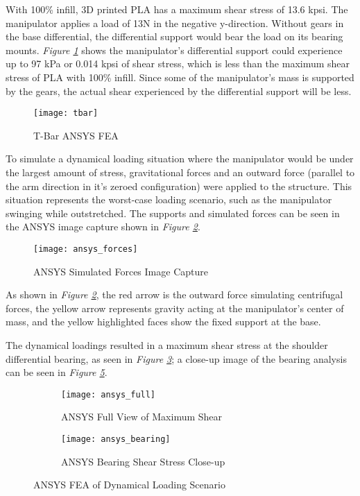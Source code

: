 With 100\% infill, 3D printed PLA has a maximum shear stress of 13.6 kpsi. The manipulator applies a load of 13N in the negative y-direction. Without gears in the base differential, the differential support would bear the load on its bearing mounts. \emph{Figure \ref{fig:tbar}} shows the manipulator’s differential support could experience up to 97 kPa or 0.014 kpsi of shear stress, which is less than the maximum shear stress of PLA with 100\% infill. Since some of the manipulator’s mass is supported by the gears, the actual shear experienced by the differential support will be less.

\begin{figure}[htp]
  \center
  \texttt{[image: tbar]}
  \caption{T-Bar ANSYS FEA}
  \label{fig:tbar}
\end{figure}

To simulate a dynamical loading situation where the manipulator would be under the largest amount of stress, gravitational forces and an outward force (parallel to the arm direction in it's zeroed configuration) were applied to the structure. This situation represents the worst-case loading scenario, such as the manipulator swinging while outstretched. The supports and simulated forces can be seen in the ANSYS image capture shown in \emph{Figure \ref{fig:ansys_forces}}.
\begin{figure}[htp]
  \center
  \texttt{[image: ansys\_forces]}
  \caption{ANSYS Simulated Forces Image Capture}
  \label{fig:ansys_forces}
\end{figure}
\newpage
As shown in \emph{Figure \ref{fig:ansys_forces}}, the red arrow is the outward force simulating centrifugal forces, the yellow arrow represents gravity acting at the manipulator's center of mass, and the yellow highlighted faces show the fixed support at the base.

The dynamical loadings resulted in a maximum shear stress at the shoulder differential bearing, as seen in \emph{Figure \ref{fig:ansys_full}}; a close-up image of the bearing analysis can be seen in \emph{Figure \ref{fig:ansys_bearing}}.

\begin{figure}[htp]
  \center
  \begin{subfigure}[t]{0.5\textwidth}
  \center
  \texttt{[image: ansys\_full]}
  \caption{ANSYS Full View of Maximum Shear}
  \label{fig:ansys_full}
\end{subfigure}%
\begin{subfigure}[t]{0.5\textwidth}
  \center
  \texttt{[image: ansys\_bearing]}
  \caption{ANSYS Bearing Shear Stress Close-up}
  \label{fig:ansys_bearing}
\end{subfigure}
  \caption{ANSYS FEA of Dynamical Loading Scenario}
\end{figure}

